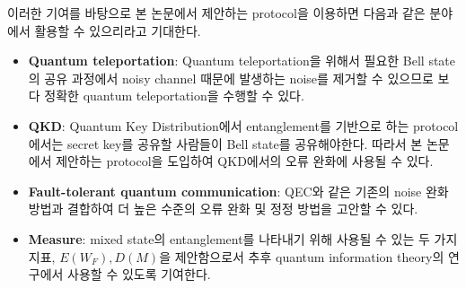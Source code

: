 \documentclass[
]{kaohandt}
\begin{document}
\pagebreak
이러한 기여를 바탕으로 본 논문에서 제안하는 protocol을 이용하면 다음과 같은 분야에서 활용할 수 있으리라고 기대한다.
\begin{itemize}
    \item \textbf{Quantum teleportation}: Quantum teleportation을 위해서 필요한 Bell state의 공유 과정에서 noisy channel 때문에 발생하는 noise를 제거할 수 있으므로 보다 정확한 quantum teleportation을 수행할 수 있다. 
    \item \textbf{QKD}: Quantum Key Distribution에서 entanglement를 기반으로 하는 protocol에서는 secret key를 공유할 사람들이 Bell state를 공유해야한다. 따라서 본 논문에서 제안하는 protocol을 도입하여 QKD에서의 오류 완화에 사용될 수 있다.
    \item \textbf{Fault-tolerant quantum communication}: QEC와 같은 기존의 noise 완화 방법과 결합하여 더 높은 수준의 오류 완화 및 정정 방법을 고안할 수 있다.
    \item \textbf{Measure}: mixed state의 entanglement를 나타내기 위해 사용될 수 있는 두 가지 지표, $E(W_F), D(M)$을 제안함으로서 추후 quantum information theory의 연구에서 사용할 수 있도록 기여한다.
\end{itemize}




\printbibliography[title=Bibliography] %
\end{document}
